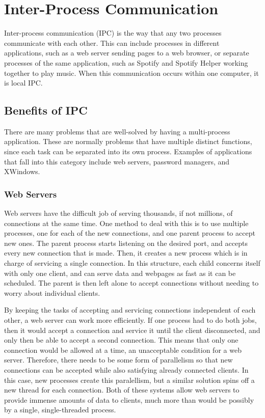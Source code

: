 \chapter{Inter-Process Communication}
\label{sec:interProcessCommunication}

Inter-process communication (IPC) is the way that any two processes communicate with each other.  This can include processes in different applications, such as a web server sending pages to a web browser, or separate processes of the same application, such as Spotify and Spotify Helper working together to play music.  When this communication occurs within one computer, it is local IPC.


\section{Benefits of IPC}
\label{sec:benefitsOfIPC}
There are many problems that are well-solved by having a multi-process application.  These are normally problems that have multiple distinct functions, since each task can be separated into its own process.  Examples of applications that fall into this category include web servers, password managers, and XWindows.

\subsection{Web Servers}
\label{sec:webServers}
Web servers have the difficult job of serving thousands, if not millions, of connections at the same time.  One method to deal with this is to use multiple processes, one for each of the new connections, and one parent process to accept new ones.  The parent process starts listening on the desired port, and accepts every new connection that is made.  Then, it creates a new process which is in charge of servicing a single connection.  In this structure, each child concerns itself with only one client, and can serve data and webpages as fast as it can be scheduled.  The parent is then left alone to accept connections without needing to worry about individual clients.

By keeping the tasks of accepting and servicing connections independent of each other, a web server can work more efficiently.  If one process had to do both jobs, then it would accept a connection and service it until the client disconnected, and only then be able to accept a second connection.  This means that only one connection would be allowed at a time, an unacceptable condition for a web server.  Therefore, there needs to be some form of parallelism so that new connections can be accepted while also satisfying already connected clients.  In this case, new processes create this paralellism, but a similar solution spins off a new thread for each connection.  Both of these systems allow web servers to provide immense amounts of data to clients, much more than would be possibly by a single, single-threaded process.

